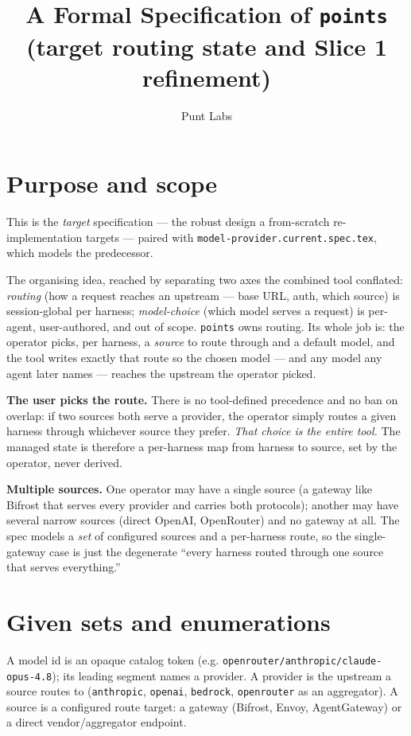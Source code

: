 \documentclass{article}
\begin{document}
\title{A Formal Specification of \texttt{points} (target routing state and Slice 1 refinement)}
\author{Punt Labs}
\maketitle

\section{Purpose and scope}

This is the \emph{target} specification --- the robust design a from-scratch
re-implementation targets --- paired with
\texttt{model-provider.current.spec.tex}, which models the predecessor.

The organising idea, reached by separating two axes the combined tool conflated:
\emph{routing} (how a request reaches an upstream --- base URL, auth, which
source) is session-global per harness; \emph{model-choice} (which model serves a
request) is per-agent, user-authored, and out of scope. \texttt{points}
owns routing. Its whole job is: the operator picks, per harness, a \emph{source}
to route through and a default model, and the tool writes exactly that route so
the chosen model --- and any model any agent later names --- reaches the upstream
the operator picked.

\textbf{The user picks the route.} There is no tool-defined precedence and no
ban on overlap: if two sources both serve a provider, the operator simply routes
a given harness through whichever source they prefer. \emph{That choice is the
	entire tool.} The managed state is therefore a per-harness map from harness to
source, set by the operator, never derived.

\textbf{Multiple sources.} One operator may have a single source (a gateway like
Bifrost that serves every provider and carries both protocols); another may have
several narrow sources (direct OpenAI, OpenRouter) and no gateway at all. The
spec models a \emph{set} of configured sources and a per-harness route, so the
single-gateway case is just the degenerate ``every harness routed through one
source that serves everything.''

\section{Given sets and enumerations}

A model id is an opaque catalog token (e.g.
\texttt{openrouter/anthropic/claude-opus-4.8}); its leading segment names a
provider. A provider is the upstream a source routes to (\texttt{anthropic},
\texttt{openai}, \texttt{bedrock}, \texttt{openrouter} as an aggregator). A
source is a configured route target: a gateway (Bifrost, Envoy, AgentGateway) or
a direct vendor/aggregator endpoint.
\end{document}
